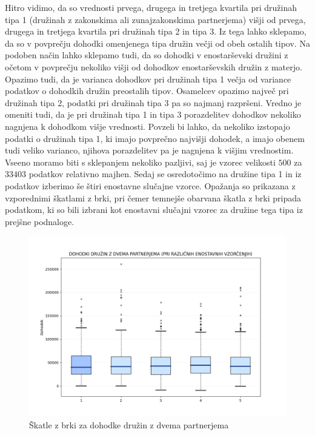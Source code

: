 \documentclass{article}
\begin{document}
Hitro vidimo, da so vrednosti prvega, drugega in tretjega kvartila pri družinah tipa 1 (družinah z zakonskima ali zunajzakonskima partnerjema) višji od prvega, drugega in tretjega kvartila pri družinah tipa 2 in tipa 3. 
Iz tega lahko sklepamo, da so v povprečju dohodki omenjenega tipa družin večji od obeh ostalih tipov. Na podoben način lahko sklepamo tudi, da so dohodki v enostarševski družini z očetom v povprečju nekoliko višji od dohodkov enostarševskih družin z materjo. 
Opazimo tudi, da je varianca dohodkov pri družinah tipa 1 večja od variance podatkov o dohodkih družin preostalih tipov. 
Osamelcev opazimo največ pri družinah tipa 2, podatki pri družinah tipa 3 pa so najmanj razpršeni. 
Vredno je omeniti tudi, da je pri družinah tipa 1 in tipa 3 porazdelitev dohodkov nekoliko nagnjena k dohodkom višje vrednosti.
\newline
Povzeli bi lahko, da nekoliko izstopajo podatki o družinah tipa 1, ki imajo povprečno najvišji dohodek, a imajo obenem tudi veliko varianco, njihova porazdelitev pa je nagnjena k višjim vrednostim.
Vseeno moramo biti s sklepanjem nekoliko pazljivi, saj je vzorec velikosti $500$ za $33403$ podatkov relativno majhen.
\newline
\newline
Sedaj se osredotočimo na družine tipa 1 in iz podatkov izberimo še štiri enostavne slučajne vzorce. 
Opažanja so prikazana z vzporednimi škatlami z brki, pri čemer temnejše obarvana škatla z brki pripada podatkom, ki so bili izbrani kot enostavni slučajni vzorec za družine tega tipa iz prejšne podnaloge.

\begin{figure}[H]
    \begin{center}
    \includegraphics[width=\linewidth]{naloga1b.png}
    \vspace*{-10mm}\caption{Škatle z brki za dohodke družin z dvema partnerjema}
    \end{center}    
\end{figure}
\end{document}
